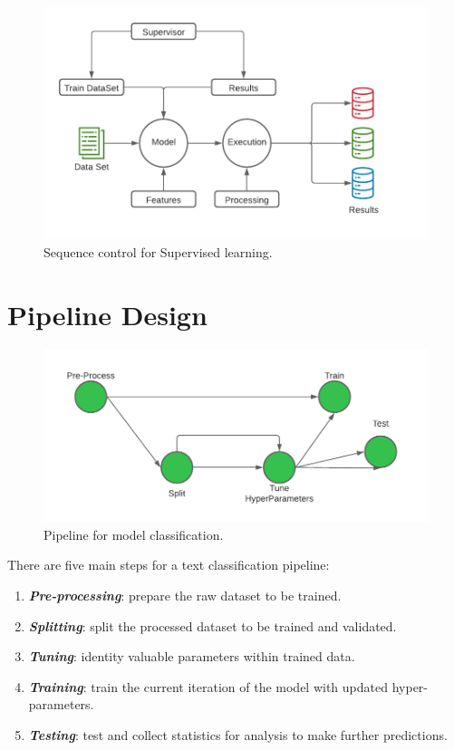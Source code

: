 \begin{figure}[H]
    \centering
    \includegraphics[width=\textwidth]{figures/chapter-5/SupervisedLearningChart.pdf}
    \caption[SupervisedLearning]{Sequence control for Supervised learning.
    \label{fig:SupervisedLearningChart}}
\end{figure}

\section{Pipeline Design}

\begin{figure}[H]
    \centering
    \includegraphics[width=\textwidth]{figures/chapter-5/Pipeline.pdf}
    \caption[MLTCPipeline]{Pipeline for model classification.
    \label{fig:MLTCPipeline}}
\end{figure}

There are five main steps for a text classification pipeline:

\begin{enumerate}
    \item \textbf{\textit{Pre-processing}}: prepare the raw dataset to be trained.
    \item \textbf{\textit{Splitting}}: split the processed dataset to be trained and validated.
    \item \textbf{\textit{Tuning}}: identity valuable parameters within trained data.
    \item \textbf{\textit{Training}}: train the current iteration of the model with updated hyper-parameters.
    \item \textbf{\textit{Testing}}: test and collect statistics for analysis to make further predictions.
\end{enumerate}

